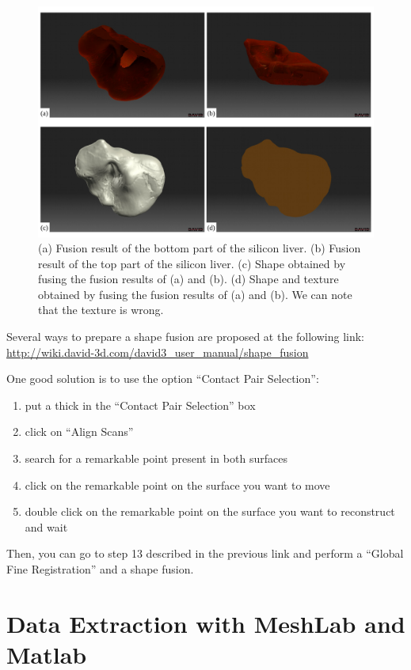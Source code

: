 \documentclass[11pt]{article}
\begin{document}
\begin{figure}[h]
\begin{center}
 		\includegraphics[width=15 cm]{images/illustration_brownTexture.pdf}
 	\end{center}
 	\caption{(a) Fusion result of the bottom part of the silicon liver. (b) Fusion result of the top part of the silicon liver. (c) Shape obtained by fusing the fusion results of (a) and (b). (d) Shape and texture obtained by fusing the fusion results of (a) and (b). We can note that the texture is wrong.}
 	\label{fig:brownTexture}
\end{figure}

Several ways to prepare a shape fusion are proposed at the following link:
\url{http://wiki.david-3d.com/david3_user_manual/shape_fusion}

One good solution is to use the option ``Contact Pair Selection'':
\begin{enumerate}
\item put a thick in the ``Contact Pair Selection'' box
\item click on ``Align Scans''
\item search for a remarkable point present in both surfaces
\item click on the remarkable point on the surface you want to move
\item double click on the remarkable point on the surface you want to reconstruct and wait
\end{enumerate}

Then, you can go to step 13 described in the previous link and perform a ``Global Fine Registration'' and a shape fusion.


\section{Data Extraction with MeshLab and Matlab}
\end{document}
